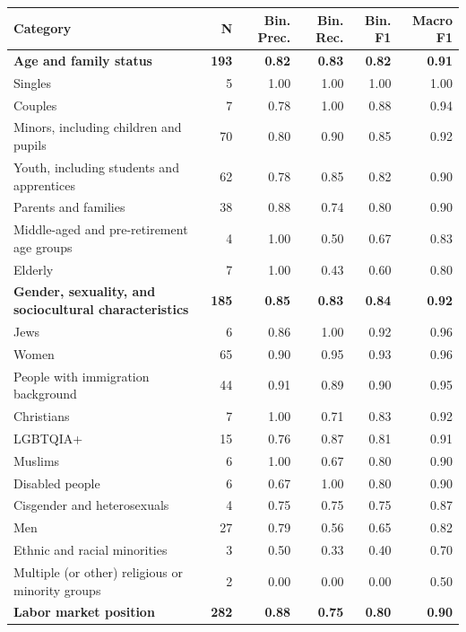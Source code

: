 \begin{table}[htb]
\centering
\scriptsize
\begin{tabular}{l r r r r r}
\toprule
Category & N & Bin. Prec. & Bin. Rec. & Bin. F1 & Macro F1 \\
\midrule
\addlinespace
\textbf{Age and family status} & \textbf{193} & \textbf{0.82} & \textbf{0.83} & \textbf{0.82} & \textbf{0.91} \\
\quad Singles & 5 & 1.00 & 1.00 & 1.00 & 1.00 \\
\quad Couples & 7 & 0.78 & 1.00 & 0.88 & 0.94 \\
\quad Minors, including children and pupils & 70 & 0.80 & 0.90 & 0.85 & 0.92 \\
\quad Youth, including students and apprentices & 62 & 0.78 & 0.85 & 0.82 & 0.90 \\
\quad Parents and families & 38 & 0.88 & 0.74 & 0.80 & 0.90 \\
\quad Middle-aged and pre-retirement age groups & 4 & 1.00 & 0.50 & 0.67 & 0.83 \\
\quad Elderly & 7 & 1.00 & 0.43 & 0.60 & 0.80 \\
\addlinespace
\textbf{Gender, sexuality, and sociocultural characteristics} & \textbf{185} & \textbf{0.85} & \textbf{0.83} & \textbf{0.84} & \textbf{0.92} \\
\quad Jews & 6 & 0.86 & 1.00 & 0.92 & 0.96 \\
\quad Women & 65 & 0.90 & 0.95 & 0.93 & 0.96 \\
\quad People with immigration background & 44 & 0.91 & 0.89 & 0.90 & 0.95 \\
\quad Christians & 7 & 1.00 & 0.71 & 0.83 & 0.92 \\
\quad LGBTQIA+ & 15 & 0.76 & 0.87 & 0.81 & 0.91 \\
\quad Muslims & 6 & 1.00 & 0.67 & 0.80 & 0.90 \\
\quad Disabled people & 6 & 0.67 & 1.00 & 0.80 & 0.90 \\
\quad Cisgender and heterosexuals & 4 & 0.75 & 0.75 & 0.75 & 0.87 \\
\quad Men & 27 & 0.79 & 0.56 & 0.65 & 0.82 \\
\quad Ethnic and racial minorities & 3 & 0.50 & 0.33 & 0.40 & 0.70 \\
\quad Multiple (or other) religious or minority groups & 2 & 0.00 & 0.00 & 0.00 & 0.50 \\
\addlinespace
\textbf{Labor market position} & \textbf{282} & \textbf{0.88} & \textbf{0.75} & \textbf{0.80} & \textbf{0.90} \\

\end{tabular}
\end{table}
